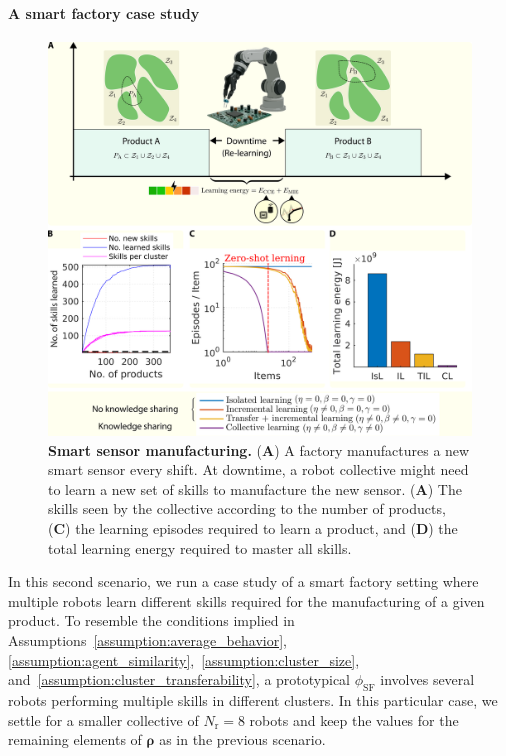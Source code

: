 \documentclass[12pt]{article}
\renewcommand{\emph}[1]{\textit{#1}}
\newcommand\mybox[2][]{\tikz[overlay]\node[fill=blue!100,inner sep=4pt, anchor=text, rectangle, rounded corners=1mm,#1] {#2};\phantom{#2}}
\newcommand{\TODO}[1]{\mybox[fill=yellow]{\textcolor{blue}{\warning~\Large \textbf{TODO}}:~\textcolor{blue}{\textbf{\emph{#1}}}}}
\begin{document}
\paragraph*{A smart factory case study}
\begin{figure}[t!]
	\centering
	\hspace*{\fill}
	\includegraphics[width=16cm]{smart_factory_case_study.png}
	\hspace*{\fill}
	\caption[] {\label{fig:smart_factory_case_study} \textbf{Smart sensor manufacturing.} {(\textbf{A}) A factory manufactures a new smart sensor every shift. At downtime, a robot collective might need to learn a new set of skills to manufacture the new sensor. (\textbf{A}) The skills seen by the collective according to the number of products, (\textbf{C}) the learning episodes required to learn a product, and (\textbf{D}) the total learning energy required to master all skills. %
    }}
\end{figure}

In this second scenario, we run a case study of a smart factory setting where multiple robots learn different skills required for the manufacturing of a given product. To resemble the conditions implied in Assumptions~\ref{assumption:average_behavior}, \ref{assumption:agent_similarity},~\ref{assumption:cluster_size}, and~\ref{assumption:cluster_transferability}, a prototypical $\phi_\text{SF}$ involves several robots performing multiple skills in different clusters. In this particular case, we settle for a smaller collective of $N_\mathrm{r} = 8$ robots and keep the values for the remaining elements of $ \bm{\rho} $ as in the previous scenario. 
\end{document}
